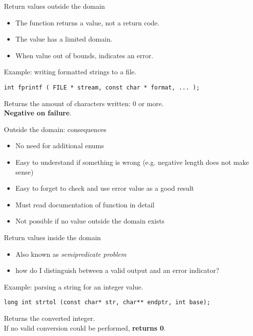 \documentclass[aspectratio=169,14pt]{beamer}
\begin{document}
\begin{frame}[fragile]{Return values outside the domain}

\begin{itemize}
    \item The function returns a value, not a return code.
    \item The value has a limited domain.
    \item When value out of bounds, indicates an error.
\end{itemize}

Example: writing formatted strings to a file.

\begin{lstlisting}[style=cstyle]
int fprintf ( FILE * stream, const char * format, ... );
\end{lstlisting}

Returns the amount of characters written: 0 or more.\\
\textbf{Negative on failure}. 
\end{frame}



\begin{frame}[fragile]{Outside the domain: consequences}
\begin{itemize}
    \item[\good] No need for additional enums
    \item[\good] Easy to understand if something is wrong (e.g. negative length does not make sense)
    \item[\bad] Easy to forget to check and use error value as a good result
    \item[\bad] Must read documentation of function in detail 
    \item[\bad] Not possible if no value outside the domain exists
\end{itemize}
\end{frame}



\begin{frame}[fragile]{Return values inside the domain}
\begin{itemize}
    \item Also known as \textit{semipredicate problem}
    \item how do I distinguish between a valid output and an error indicator?
\end{itemize}

Example: parsing a string for an integer value.

\begin{lstlisting}[style=cstyle]
long int strtol (const char* str, char** endptr, int base);
\end{lstlisting}

Returns the converted integer.\\
If no valid conversion could be performed, \textbf{returns 0}.
\end{frame}
\end{document}
